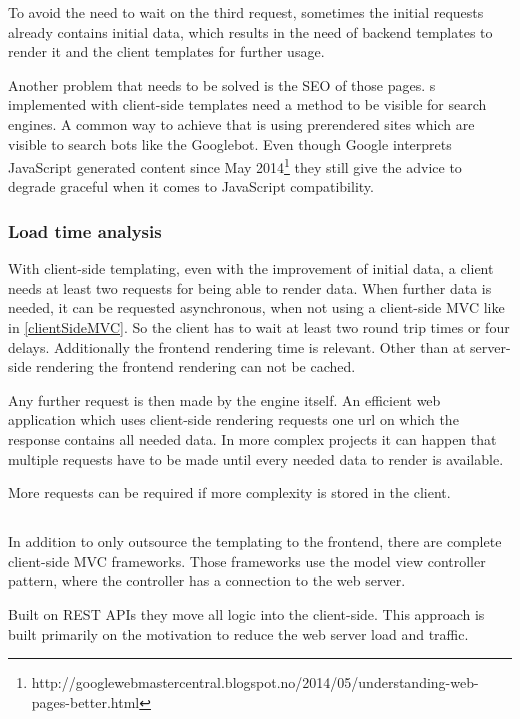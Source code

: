 To avoid the need to wait on the third request, sometimes the initial requests already contains initial data, which results in the need of backend templates to render it and the client templates for further usage.

Another problem that needs to be solved is the SEO of those pages.
\WebPage{}s implemented with client-side templates need a method to be visible for search engines.
A common way to achieve that is using prerendered sites which are visible to search bots like the Googlebot.
Even though Google interprets JavaScript generated content since May 2014\footnote{http://googlewebmastercentral.blogspot.no/2014/05/understanding-web-pages-better.html} they still give the advice to degrade graceful when it comes to JavaScript compatibility.

\subsubsection{Load time analysis}
With client-side templating, even with the improvement of initial data, a client needs at least two requests for being able to render data.
When further data is needed, it can be requested asynchronous, when not using a client-side MVC like in \ref{clientSideMVC}.
So the client has to wait at least two round trip times or four delays.
Additionally the frontend rendering time is relevant.
Other than at server-side rendering the frontend rendering can not be cached.

Any further request is then made by the \ajax{} engine itself.
An efficient web application which uses client-side rendering requests one url on which the response contains all needed data.
In more complex projects it can happen that multiple requests have to be made until every needed data to render is available.

More requests can be required if more complexity is stored in the client.


\subsection{\ClientSideMVC{}\label{clientSideMVC}}
In addition to only outsource the templating to the frontend, there are complete client-side MVC frameworks.
Those frameworks use the model view controller pattern, where the controller has a connection to the web server.

Built on REST APIs they move all logic into the client-side.
This approach is built primarily on the motivation to reduce the web server load and traffic.

